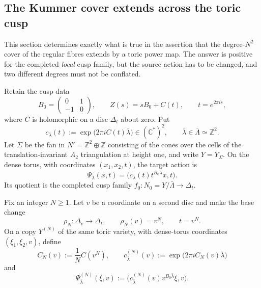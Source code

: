 \subsection{The Kummer cover extends across the toric cusp}
\label{cusp-cover-section}

This section determines exactly what is true in the assertion that the
degree-$N^2$ cover of the regular fibres extends by a toric power map.  The
answer is positive for the completed \emph{local} cusp family, but the source
action has to be changed, and two different degrees must not be conflated.

Retain the cusp data
\[
 B_0=\begin{pmatrix}0&1\\-1&0\end{pmatrix},\qquad
 Z(s)=sB_0+C(t),\qquad t=e^{2\pi i s},
\]
where $C$ is holomorphic on a disc $\Delta_t$ about zero.  Put
\[
 c_{\bar\lambda}(t)
 :=\exp\!\bigl(2\pi iC(t)\bar\lambda\bigr)
 \in(\mathbb C^*)^2,
 \qquad \bar\lambda\in\bar\Lambda\simeq\mathbb Z^2.
\]
Let $\Sigma$ be the fan in
$N'=\mathbb Z^2\oplus\mathbb Z$ consisting of the cones over the cells of
the translation-invariant $A_2$ triangulation at height one, and write
$Y=Y_\Sigma$.  On the dense torus, with coordinates $(x_1,x_2,t)$, the
target action is
\begin{equation}
 \Psi_{\bar\lambda}(x,t)
 =\bigl(c_{\bar\lambda}(t)t^{B_0\bar\lambda}x,t\bigr).
 \label{cusp-cover-target-action}
\end{equation}
Its quotient is the completed cusp family
$f_0\colon N_0=Y/\bar\Lambda\to\Delta_t$.

Fix an integer $N\geq1$.  Let $v$ be a coordinate on a second disc and
make the base change
\begin{equation}
 \rho_N\colon\Delta_v\longrightarrow\Delta_t,\qquad
 \rho_N(v)=v^N,\qquad t=v^N.
 \label{cusp-cover-base-change}
\end{equation}
On a copy $Y^{(N)}$ of the same toric variety, with dense-torus coordinates
$(\xi_1,\xi_2,v)$, define
\begin{equation}
 C_N(v):=\frac1N C(v^N),\qquad
 c^{(N)}_{\bar\lambda}(v)
 :=\exp\!\bigl(2\pi iC_N(v)\bar\lambda\bigr)
 \label{cusp-cover-source-factor}
\end{equation}
and
\begin{equation}
 \Psi^{(N)}_{\bar\lambda}(\xi,v)
 :=\bigl(c^{(N)}_{\bar\lambda}(v)
          v^{B_0\bar\lambda}\xi,v\bigr).
 \label{cusp-cover-source-action}
\end{equation}

